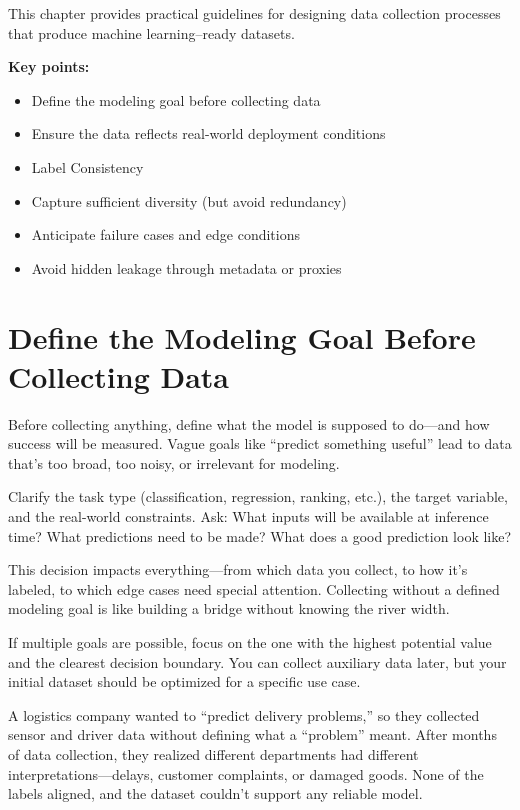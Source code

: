 \documentclass[12pt,openany]{book}
\begin{document}
This chapter provides practical guidelines for designing data collection processes that produce machine learning–ready datasets.

\textbf{Key points:}
\begin{itemize}
    \item Define the modeling goal before collecting data
    \item Ensure the data reflects real-world deployment conditions
    \item Label Consistency
    \item Capture sufficient diversity (but avoid redundancy)
    \item Anticipate failure cases and edge conditions
    \item Avoid hidden leakage through metadata or proxies
\end{itemize}


\section{Define the Modeling Goal Before Collecting Data}

Before collecting anything, define what the model is supposed to do—and how success will be measured. Vague goals like “predict something useful” lead to data that's too broad, too noisy, or irrelevant for modeling.
\newline

Clarify the task type (classification, regression, ranking, etc.), the target variable, and the real-world constraints. Ask: What inputs will be available at inference time? What predictions need to be made? What does a good prediction look like?
\newline

This decision impacts everything—from which data you collect, to how it’s labeled, to which edge cases need special attention. Collecting without a defined modeling goal is like building a bridge without knowing the river width.
\newline

If multiple goals are possible, focus on the one with the highest potential value and the clearest decision boundary. You can collect auxiliary data later, but your initial dataset should be optimized for a specific use case.

\begin{examplebox}
A logistics company wanted to “predict delivery problems,” so they collected sensor and driver data without defining what a “problem” meant. After months of data collection, they realized different departments had different interpretations—delays, customer complaints, or damaged goods. None of the labels aligned, and the dataset couldn’t support any reliable model.
\end{examplebox}
\end{document}
